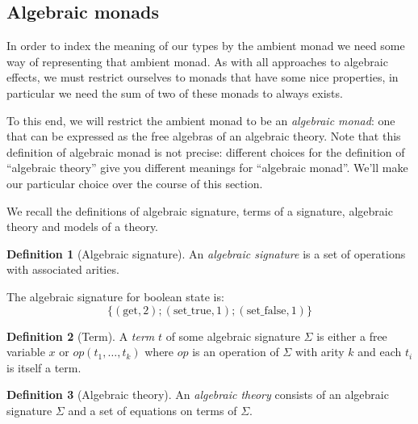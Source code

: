 \documentclass[acmsmall, screen, review, anonymous]{acmart}
\theoremstyle{definition}
\newtheorem{definition}{Definition}[section]
\begin{document}
\subsection{Algebraic monads}

In order to index the meaning of our types by the ambient monad we need
some way of representing that ambient monad. As with all approaches to
algebraic effects, we must restrict ourselves to monads that have some
nice properties, in particular we need the sum of two of these monads to
always exists.

To this end, we will restrict the ambient monad to be an \emph{algebraic
  monad}: one that can be expressed as the free algebras of an algebraic
theory. Note that this definition of algebraic monad is not precise:
different choices for the definition of ``algebraic theory'' give you
different meanings for ``algebraic monad''. We'll make our particular
choice over the course of this section.

We recall the definitions of algebraic signature, terms of a signature,
algebraic theory and models of a theory.
\begin{definition}[Algebraic signature]
  An \emph{algebraic signature} is a set of operations with associated
  arities.
\end{definition}

\begin{example}
  The algebraic signature for boolean state is:
  \begin{equation*}
    \{ (\mathrm{get}, 2); (\mathrm{set\_true}, 1); (\mathrm{set\_false}, 1) \}
  \end{equation*}
\end{example}

\begin{definition}[Term]
  A \emph{term} $t$ of some algebraic signature $\Sigma$ is either a
  free variable $x$ or $op(t_1, \ldots, t_k)$ where $op$ is an operation
  of $\Sigma$ with arity $k$ and each $t_i$ is itself a term.
\end{definition}

\begin{definition}[Algebraic theory]
  An \emph{algebraic theory} consists of an algebraic signature $\Sigma$ and a set of
  equations on terms of $\Sigma$.
\end{definition}
\end{document}
